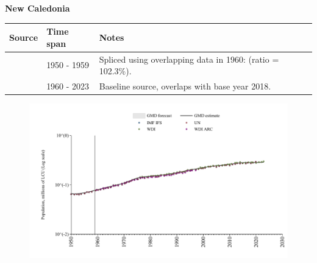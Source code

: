\documentclass[12pt,a4paper,landscape]{article}
\begin{document}
\begin{adjustbox}{max totalsize={\paperwidth}{\paperheight},center}
\begin{minipage}[t][\textheight][t]{\textwidth}
\vspace*{0.5cm}
{}
\begin{center}
{\Large\bfseries New Caledonia}
\end{center}
\vspace{0.5cm}
\begin{table}[H]
\centering
\small
\begin{tabular}{|l|l|l|}
\hline
\textbf{Source} & \textbf{Time span} & \textbf{Notes} \\
\hline
\rowcolor{white}\cite{IMF_IFS}& 1950 - 1959 &Spliced using overlapping data in 1960: (ratio = 102.3\%).\\
\rowcolor{lightgray}\cite{WDI}& 1960 - 2023 &Baseline source, overlaps with base year 2018.\\
\hline
\end{tabular}
\end{table}
\begin{figure}[H]
\centering
\includegraphics[width=\textwidth,height=0.6\textheight,keepaspectratio]{graphs/NCL_pop.pdf}
\end{figure}
\end{minipage}
\end{adjustbox}
\end{document}
